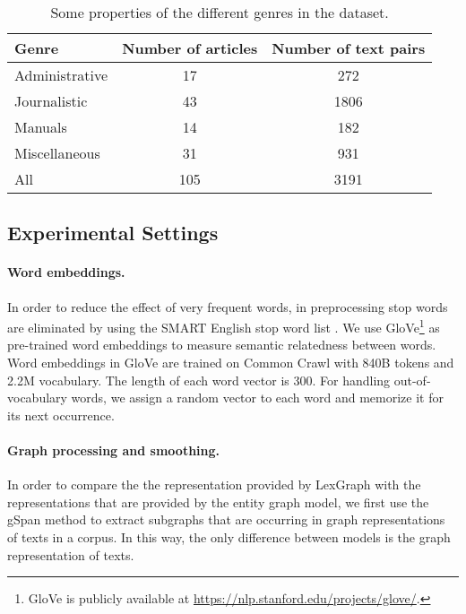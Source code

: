 \begin{table}[!ht]
  \begin{center}
    \begin{tabular}{lcc}
      \hline
        Genre           & Number of articles & Number of text pairs \\
        \hline
        Administrative  & 17                 & 272                  \\
        Journalistic    & 43                 & 1806                 \\
        Manuals         & 14                 & 182                  \\
        Miscellaneous   & 31                 & 931                  \\
        All             & 105                & 3191                 \\
        \hline
    \end{tabular}
  \end{center}
  \caption{Some properties of the different genres in the \declercqds dataset.}
  \label{tab:genre-prop}
\end{table}

\subsection{Experimental Settings}


\paragraph{Word embeddings.}
In order to reduce the effect of very frequent words, in preprocessing stop words are eliminated by using the SMART English stop word list \cite{salton71}.  
We use GloVe\footnote{GloVe is publicly available at \url{https://nlp.stanford.edu/projects/glove/}.} \cite{pennington14} as \mbox{pre-trained} word embeddings to measure semantic relatedness between words. 
Word embeddings in GloVe are trained on Common Crawl with 840B tokens and 2.2M vocabulary. 
The length of each word vector is 300. 
For handling \mbox{out-of-vocabulary} words, we assign a random vector to each word and memorize it for its next occurrence.  

\paragraph{Graph processing and smoothing.} 
In order to compare the the representation provided by LexGraph with the representations that are provided by the entity graph model, we first use the gSpan method \cite{yanxifeng02} to extract subgraphs that are occurring in graph representations of texts in a corpus. 
In this way, the only difference between models is the graph representation of texts. 


